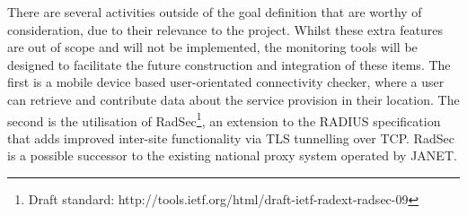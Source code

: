 \documentclass[pdflatex, a4paper,12pt]{article}
\begin{document}
There are several activities outside of the goal definition that are worthy of
consideration, due to their relevance to the project. Whilst these extra
features are out of scope and will not be implemented, the monitoring tools will
be designed to facilitate the future construction and integration of these items.
 The first is a
mobile device based user-orientated connectivity checker, where a user can
retrieve and contribute data about the service provision in their location. The
second is the utilisation of RadSec\footnote[3]{Draft standard:
http://tools.ietf.org/html/draft-ietf-radext-radsec-09}, an extension to the RADIUS specification
that adds improved inter-site functionality via TLS tunnelling over TCP. RadSec
is a possible successor to the existing national proxy system operated by JANET.
\end{document}
